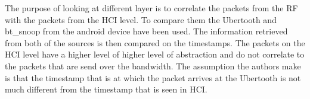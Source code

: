 The purpose of looking at different layer is to correlate the packets from the RF with the packets from the HCI level. To compare them the Ubertooth and bt\_snoop from the android device have been used. The information retrieved from both of the sources is then compared on the timestamps. The packets on the HCI level have a higher level of higher level of abstraction and do not correlate to the packets that are send over the bandwidth. The assumption the authors make is that the timestamp that is at which the packet arrives at the Ubertooth is not much different from the timestamp that is seen in HCI.
